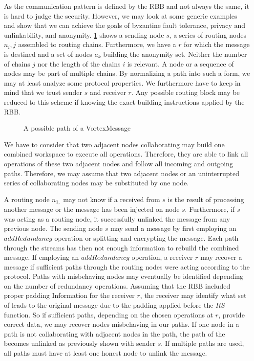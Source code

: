 As the communication pattern is defined by the RBB and not always the same, it is hard to judge the security. However, we may look at some generic examples and show that we can achieve the goals of byzantine fault tolerance, privacy and unlinkability, and anonymity. \cref{fig:messagePaths} shows a sending node $s$, a series of routing nodes $n_i,j$ assembled to routing chains. Furthermore, we have a $r$ for which the message is destined and a set of nodes $a_k$ building the anonymity set. Neither the number of chains $j$ nor the length of the chains $i$ is relevant. A node or a sequence of nodes may be part of multiple chains. By normalizing a path into such a form, we may at least analyze some protocol properties. We furthermore have to keep in mind that we trust sender $s$ and receiver $r$. Any possible routing block may be reduced to this scheme if knowing the exact building instructions applied by the RBB.

\begin{figure}[ht]
	\centering\resizebox{.95\linewidth}{!}{
		
	}
	\caption{A possible path of a VortexMessage}
	\label{fig:messagePaths}
\end{figure}

We have to consider that two adjacent nodes collaborating may build one combined workspace to execute all operations. Therefore, they are able to link all operations of these two adjacent nodes and follow all incoming and outgoing paths. Therefore, we may assume that two adjacent nodes or an uninterrupted series of collaborating nodes may be substituted by one node.

A routing node $n_{1,}$ may not know if a \VortexMessage{} received from $s$ is the result of processing another message or the message has been injected on node $s$. Furthermore, if $s$ was acting as a routing node, it successfully unlinked the message from any previous node. The sending node $s$ may send a message by first employing an $addRedundancy$ operation or splitting and encrypting the message. Each path through the streams has then not enough information to rebuild the combined message. If employing an $addRedundancy$ operation, a receiver $r$ may recover a message if sufficient paths through the routing nodes were acting according to the protocol. Paths with misbehaving nodes may eventually be identified depending on the number of redundancy operations. Assuming that the RBB included proper padding Information for the receiver $r$, the receiver may identify what set of \VortexMessages leads to the original message due to the padding applied before the $RS$ function. So if sufficient paths, depending on the chosen operations at $r$, provide correct data, we may recover nodes misbehaving in our paths. If one node in a path is not collaborating with adjacent nodes in the path, the path of the \VortexMessage becomes unlinked as previously shown with sender $s$. If multiple paths are used, all paths must have at least one honest node to unlink the message. 

